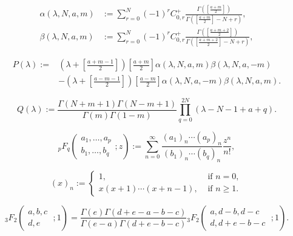 \documentclass[10pt,a4paper]{amsart}
\begin{document}
\begin{align}
\label{def-alpha}
\alpha(\lambda, N, a, m) &:= \sum_{r = 0}^{N}(-1)^r C_{0,r}^+\frac{\Gamma\left(\left[\frac{a+m}{2}\right]\right)}{\Gamma\left(\left[\frac{a+m}{2}\right]-N+r\right)},\\
\label{def-beta}
\beta(\lambda, N, a, m) &:= \sum_{r = 0}^{N}(-1)^r C_{0,r}^+\frac{\Gamma\left(\left[\frac{a+m+2}{2}\right]\right)}{\Gamma\left(\left[\frac{a+m+2}{2}\right]-N+r\right)},
\end{align}

\begin{equation}\label{def-P(lambda)}
\begin{aligned}
P(\lambda):= &\left(\lambda+\left[\frac{a+m-1}{2}\right]\right)\left[\frac{a+m}{2}\right]\alpha(\lambda, N, a, m)\beta(\lambda, N, a, -m)\\
&- \left(\lambda+\left[\frac{a-m-1}{2}\right]\right)\left[\frac{a-m}{2}\right]\alpha(\lambda, N, a, -m)\beta(\lambda, N, a, m).
\end{aligned}
\end{equation}

\begin{equation}\label{def-Q(lambda)}
Q(\lambda) := \frac{\Gamma(N+m+1)\Gamma(N-m+1)}{\Gamma(m)\Gamma(1-m)}\prod_{q=0}^{2N}(\lambda-N-1+a+q).
\end{equation}

\begin{equation}\label{def-hypergeometric}
{}_pF_q\left(
\begin{matrix}
a_1, \ldots, a_p\\
b_1, \ldots, b_q 
\end{matrix}
; z\right) := \sum_{n=0}^{\infty} \frac{(a_1)_n \cdots (a_p)_n}{(b_1)_n \cdots (b_q)_n}\frac{z^n}{n!},
\end{equation}

\begin{equation}\label{Pochhamer-symbol}
(x)_n := \begin{cases}
1, & \text{ if } n = 0,\\
x (x+1) \cdots (x+n-1), & \text{ if } n \geq 1.
\end{cases}
\end{equation}

\begin{equation}\label{kummer}
{}_3F_2\left(
\begin{matrix}
a, b, c\\
d, e
\end{matrix}\; ; 1\right) = \frac{\Gamma(e)\Gamma(d+e-a-b-c)}{\Gamma(e-a)\Gamma(d+e-b-c)}{}_3F_2\left(
\begin{matrix}
a, d-b, d-c\\
d, d+e-b-c
\end{matrix}\; ; 1\right).
\end{equation}
\end{document}
